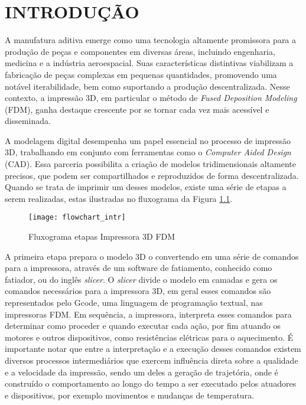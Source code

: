 \chapter{INTRODUÇÃO}
A manufatura aditiva emerge como uma tecnologia altamente promissora para a produção de peças e componentes em diversas áreas, incluindo engenharia, medicina e a indústria aeroespacial. Suas características distintivas viabilizam a fabricação de peças complexas em pequenas quantidades, promovendo uma notável iterabilidade, bem como suportando a produção descentralizada. Nesse contexto, a impressão 3D, em particular o método de \textit{Fused Deposition Modeling} (FDM), ganha destaque crescente por se tornar cada vez mais acessível e disseminada.

A modelagem digital desempenha um papel essencial no processo de impressão 3D, trabalhando em conjunto com ferramentas como o \textit{Computer Aided Design} (CAD). Essa parceria possibilita a criação de modelos tridimensionais altamente precisos, que podem ser compartilhados e reproduzidos de forma descentralizada. Quando se trata de imprimir um desses modelos, existe uma série de etapas a serem realizadas, estas ilustradas no fluxograma da Figura \ref{fig:flowchart_intr}.

\begin{figure}[H]
    \begin{center}
        \caption{Fluxograma etapas Impressora 3D FDM}
        \texttt{[image: flowchart\_intr]}

        \label{fig:flowchart_intr}
    \end{center}
\end{figure}

A primeira etapa prepara o modelo 3D o convertendo em uma série de comandos para a impressora, através de um software de fatiamento, conhecido como fatiador, ou do inglês \textit{slicer}. O \textit{slicer} divide o modelo em camadas e gera os comandos necessários para a impressora 3D, em geral esses comandos são representados pelo Gcode, uma linguagem de programação textual, nas impressoras FDM. Em sequência, a impressora, interpreta esses comandos para determinar como proceder e quando executar cada ação, por fim atuando os motores e outros dispositivos, como resistências elétricas para o aquecimento. É importante notar que entre a interpretação e a execução desses comandos existem diversos processos intermediários que exercem influência direta sobre a qualidade e a velocidade da impressão, sendo um deles a geração de trajetória, onde é construído o comportamento ao longo do tempo a ser executado pelos atuadores e dispositivos, por exemplo movimentos e mudanças de temperatura.

